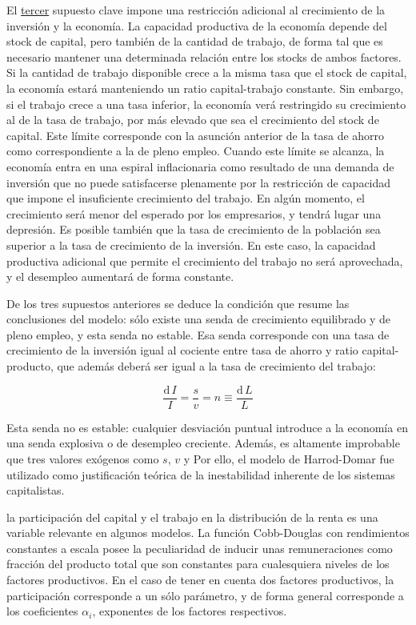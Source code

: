 \documentclass{nuevotema}
\begin{document}
El \underline{tercer} supuesto clave impone una restricción adicional al crecimiento de la inversión y la economía. La capacidad productiva de la economía depende del stock de capital, pero también de la cantidad de trabajo, de forma tal que es necesario mantener una determinada relación entre los stocks de ambos factores. Si la cantidad de trabajo disponible crece a la misma tasa que el stock de capital, la economía estará manteniendo un ratio capital-trabajo constante. Sin embargo, si el trabajo crece a una tasa inferior, la economía verá restringido su crecimiento al de la tasa de trabajo, por más elevado que sea el crecimiento del stock de capital. Este límite corresponde con la asunción anterior de la tasa de ahorro como correspondiente a la de pleno empleo. Cuando este límite se alcanza, la economía entra en una espiral inflacionaria como resultado de una demanda de inversión que no puede satisfacerse plenamente por la restricción de capacidad que impone el insuficiente crecimiento del trabajo. En algún momento, el crecimiento será menor del esperado por los empresarios, y tendrá lugar una depresión. Es posible también que la tasa de crecimiento de la población sea superior a la tasa de crecimiento de la inversión. En este caso, la capacidad productiva adicional que permite el crecimiento del trabajo no será aprovechada, y el desempleo aumentará de forma constante.

De los tres supuestos anteriores se deduce la condición que resume las conclusiones del modelo: sólo existe una senda de crecimiento equilibrado y de pleno empleo, y esta senda no estable. Esa senda corresponde con una tasa de crecimiento de la inversión igual al cociente entre tasa de ahorro y ratio capital-producto, que además deberá ser igual a la tasa de crecimiento del trabajo:

\begin{equation}
	\frac{\text{d} \, I}{I} = \frac{s}{v} = n \equiv \frac{\text{d} \, L}{L}
\end{equation}

Esta senda no es estable: cualquier desviación puntual introduce a la economía en una senda explosiva o de desempleo creciente. Además, es altamente improbable que tres valores exógenos como $s$, $v$ y  Por ello, el modelo de Harrod-Domar fue utilizado como justificación teórica de la inestabilidad inherente de los sistemas capitalistas.

 la participación del capital y el trabajo en la distribución de la renta es una variable relevante en algunos modelos. La función Cobb-Douglas con rendimientos constantes a escala posee la peculiaridad de inducir unas remuneraciones como fracción del producto total que son constantes para cualesquiera niveles de los factores productivos. En el caso de tener en cuenta dos factores productivos, la participación corresponde a un sólo parámetro, y de forma general corresponde a los coeficientes $\alpha_i$, exponentes de los factores respectivos.
\end{document}
